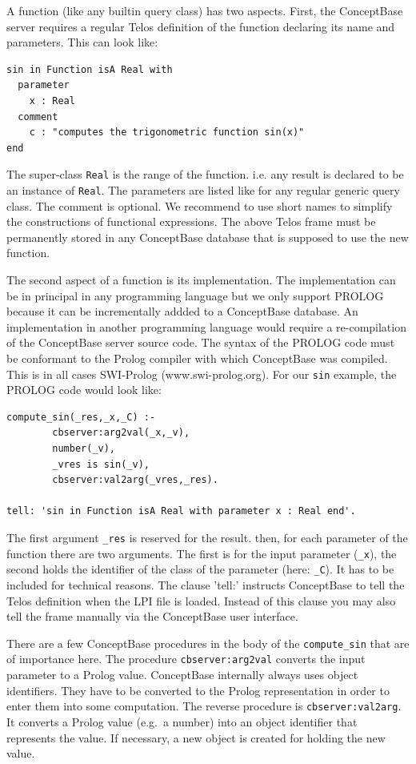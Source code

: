 A function (like any builtin query class) has two aspects. First, the ConceptBase server requires
a regular Telos definition of the function declaring its name and parameters. This can look like:

{\small
\begin{verbatim}
sin in Function isA Real with
  parameter
    x : Real
  comment
    c : "computes the trigonometric function sin(x)" 
end
\end{verbatim}
}

The super-class {\tt Real} is the range of the function. i.e. any result is declared to be
an instance of {\tt Real}. The parameters are listed like for any regular generic query
class. The comment is optional.
We recommend to use short names to simplify the constructions of functional expressions.
The above Telos frame must be permanently stored in any ConceptBase database that is supposed to
use the new function.

The second aspect of a function is its implementation. The implementation can be in principal
in any programming language but we only support PROLOG because it can be incrementally addded
to a ConceptBase database. An implementation in another programming language would
require a re-compilation of the ConceptBase server source code. The syntax of the PROLOG code
must be conformant to the Prolog compiler with which ConceptBase was compiled. This is
in all cases SWI-Prolog (www.swi-prolog.org). For our {\tt sin} example, the PROLOG code would look like:

{\small
\begin{verbatim}
compute_sin(_res,_x,_C) :-
        cbserver:arg2val(_x,_v),
        number(_v),
        _vres is sin(_v),
        cbserver:val2arg(_vres,_res).

tell: 'sin in Function isA Real with parameter x : Real end'.
\end{verbatim}
}

The first argument {\tt \_res} is reserved for the result. then, for each parameter of the function
there are two arguments. The first is for the input parameter ({\tt \_x}), the second holds the
identifier of the class of the parameter (here: {\tt \_C}). It has to be included for technical
reasons. The clause 'tell:' instructs ConceptBase to tell the Telos definition when the
LPI file is loaded. Instead of this clause you may also tell the frame manually via the ConceptBase
user interface.

There are a few ConceptBase procedures in the body of the  {\tt compute\_sin} that are of importance here.
The procedure {\tt cbserver:arg2val}  converts the input parameter to a Prolog value. ConceptBase 
internally always uses object identifiers. They have to be converted to the Prolog representation in
order to enter them into some computation. The reverse procedure is {\tt cbserver:val2arg}. It converts
a Prolog value (e.g.\ a number) into an object identifier that represents the value. If necessary, a new
object is created for holding the new value.

